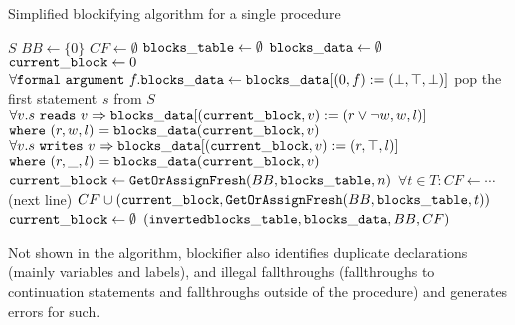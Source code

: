 \begin{algorithm}[t]
    \caption{Simplified blockifying algorithm for a single procedure}
    \label{alg:blockifying}
    \begin{algorithmic}
        \Require $S$ 
        \State $BB \gets \{0\}$ 
        \State $CF \gets \emptyset$ 
        \State $\mathtt{blocks\_table} \gets \emptyset$ 
        \State $\mathtt{blocks\_data} \gets \emptyset$ 
        \State $\mathtt{current\_block} \gets 0$ 
        \State $\forall \mathtt{formal\ argument}\ f . \mathtt{blocks\_data} \gets \mathtt{blocks\_data} [ (0, f) := (\bot, \top, \bot) ]$
            \State pop the first statement $s$ from $S$
                \State {}
                \State $\forall v . s\ \mathtt{reads}\ v \Rightarrow \mathtt{blocks\_data} [ (\mathtt{current\_block}, v) := (r \lor \neg w, w, l) ]$
                \State \quad\quad $\mathtt{where}\ (r, w, l) = \mathtt{blocks\_data}(\mathtt{current\_block}, v)$
                \State $\forall v . s\ \mathtt{writes}\ v \Rightarrow \mathtt{blocks\_data} [ (\mathtt{current\_block}, v) := (r, \top, l) ]$
                \State \quad\quad $\mathtt{where}\ (r, \_, l) = \mathtt{blocks\_data}(\mathtt{current\_block}, v)$
                \State {}
            \EndIf
                \State $\mathtt{current\_block} \gets \mathtt{GetOrAssignFresh}(BB, \mathtt{blocks\_table},n)$
                \State $\forall t \in T: CF \gets \cdots$  (next line)
                \State $CF \cup (\mathtt{current\_block}, \mathtt{GetOrAssignFresh}(BB, \mathtt{blocks\_table},t))$
                \State $\mathtt{current\_block} \gets \emptyset$
            \EndIf
            \State \Return $(\mathtt{inverted } \mathtt{blocks\_table}, \mathtt{blocks\_data}, BB, CF)$
        \EndWhile
    \end{algorithmic}
\end{algorithm}

Not shown in the algorithm, blockifier also identifies duplicate declarations (mainly variables and labels), and illegal fallthroughs (fallthroughs to continuation statements and fallthroughs outside of the procedure) and generates errors for such.

